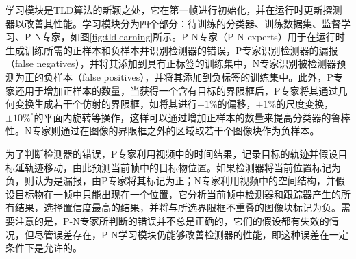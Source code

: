   学习模块是TLD算法的新颖之处，它在第一帧进行初始化，并在运行时更新探测器以改善其性能。学习模块分为四个部分：待训练的分类器、训练数据集、监督学习、P-N专家，如图\ref{fig:tldlearning}所示。P-N专家（P-N experts）用于在运行时生成训练所需的正样本和负样本并识别检测器的错误，P专家识别检测器的漏报（false negatives），并将其添加到具有正标签的训练集中，N专家识别被检测器预测为正的负样本（false positives），并将其添加到负标签的训练集中。此外，P专家还用于增加正样本的数量，当获得一个含有目标的界限框后，P专家将其通过几何变换生成若干个仿射的界限框，如将其进行$\pm 1\%$的偏移，$\pm 1\%$的尺度变换，$\pm 10\%^{\circ}$的平面内旋转等操作，这样可以通过增加正样本的数量来提高分类器的鲁棒性。N专家则通过在图像的界限框之外的区域取若干个图像块作为负样本。


  为了判断检测器的错误，P专家利用视频中的时间结果，记录目标的轨迹并假设目标延轨迹移动，由此预测当前帧中的目标物位置。如果检测器将当前位置标记为负，则认为是漏报，由P专家将其标记为正；N专家利用视频中的空间结构，并假设目标物在一帧中只能出现在一个位置，它分析当前帧中检测器和跟踪器产生的所有结果，选择置信度最高的结果，并将与所选界限框不重叠的图像块标记为负。需要注意的是，P-N专家所判断的错误并不总是正确的，它们的假设都有失效的情况，但尽管误差存在，P-N学习模块仍能够改善检测器的性能，即这种误差在一定条件下是允许的。
